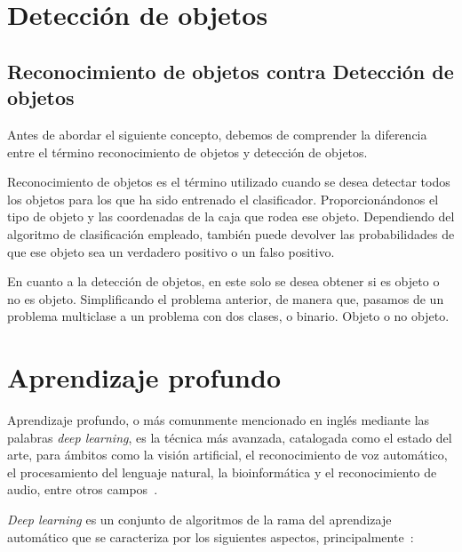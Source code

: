 \section{Detección de objetos}

\subsection{Reconocimiento de objetos contra Detección de objetos}

Antes de abordar el siguiente concepto, debemos de comprender la diferencia entre el término reconocimiento de objetos y detección de objetos.

Reconocimiento de objetos es el término utilizado cuando se desea detectar todos los objetos para los que ha sido entrenado el clasificador. Proporcionándonos el tipo de objeto y las coordenadas de la caja que rodea ese objeto. Dependiendo del algoritmo de clasificación empleado, también puede devolver las probabilidades de que ese objeto sea un verdadero positivo o un falso positivo.

En cuanto a la detección de objetos, en este solo se desea obtener si es objeto o no es objeto. Simplificando el problema anterior, de manera que, pasamos de un problema multiclase a un problema con dos clases, o binario. Objeto o no objeto.



\section{Aprendizaje profundo}

Aprendizaje profundo, o más comunmente mencionado en inglés mediante las palabras \textit{deep learning}, es la técnica más avanzada, catalogada como el estado del arte, para ámbitos como la visión artificial, el reconocimiento de voz automático, el procesamiento del lenguaje natural,  la bioinformática y el reconocimiento de audio, entre otros campos~\cite{ms:deeplearning}.

\textit{Deep learning} es un conjunto de algoritmos de la rama del aprendizaje automático que se caracteriza por los siguientes aspectos, principalmente~\cite{ms:deeplearning}:

